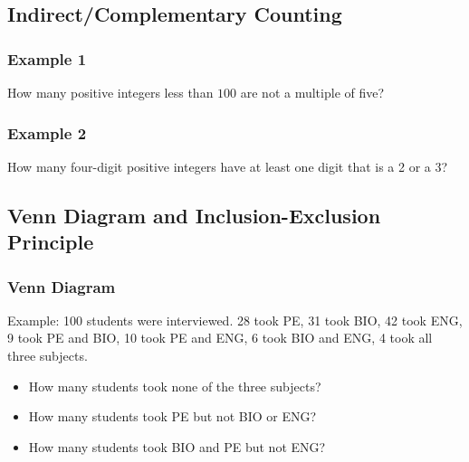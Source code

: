 \documentclass{article}
\begin{document}
\subsection{Indirect/Complementary Counting}
\subsubsection{Example 1}
How many positive integers less than $100$ are not a multiple of five?
\vspace{20px}

\subsubsection{Example 2}
How many four-digit positive integers have at least one digit that is a 2 or a 3?
\pagebreak

\subsection{Venn Diagram and Inclusion-Exclusion Principle}

\subsubsection{Venn Diagram}

Example:
100 students were interviewed.
28 took PE, 31 took BIO, 42 took ENG, 9 took PE and BIO, 10 took PE and ENG, 6 took BIO and ENG, 4 took all three subjects.
\begin{itemize}
    \item How many students took none of the three subjects?
    \item How many students took PE but not BIO or ENG?
    \item How many students took BIO and PE but not ENG?
\end{itemize}
\end{document}
